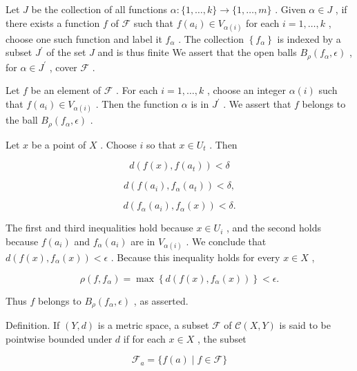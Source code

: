 \documentclass[10pt]{article}
\begin{document}
Let \(J\) be the collection of all functions \(\alpha  : \{ 1,\ldots ,k\}  \rightarrow  \{ 1,\ldots ,m\}\) . Given \(\alpha  \in  J\) , if there exists a function \(f\) of \(\mathcal{F}\) such that \(f\left( {a}_{i}\right)  \in  {V}_{\alpha \left( i\right) }\) for each \(i = 1,\ldots ,k\) , choose one such function and label it \({f}_{\alpha }\) . The collection \(\left\{  {f}_{\alpha }\right\}\) is indexed by a subset \({J}^{\prime }\) of the set \(J\) and is thus finite We assert that the open balls \({B}_{\rho }\left( {{f}_{\alpha },\epsilon }\right)\) , for \(\alpha  \in  {J}^{\prime }\) , cover \(\mathcal{F}\) .

Let \(f\) be an element of \(\mathcal{F}\) . For each \(i = 1,\ldots ,k\) , choose an integer \(\alpha \left( i\right)\) such that \(f\left( {a}_{i}\right)  \in  {V}_{\alpha \left( i\right) }\) . Then the function \(\alpha\) is in \({J}^{\prime }\) . We assert that \(f\) belongs to the ball \({B}_{\rho }\left( {{f}_{\alpha },\epsilon }\right)\) .

Let \(x\) be a point of \(X\) . Choose \(i\) so that \(x \in  {U}_{t}\) . Then

\[
d\left( {f\left( x\right) ,f\left( {a}_{t}\right) }\right)  < \delta
\]

\[
d\left( {f\left( {a}_{i}\right) ,{f}_{\alpha }\left( {a}_{t}\right) }\right)  < \delta ,
\]

\[
d\left( {{f}_{\alpha }\left( {a}_{i}\right) ,{f}_{\alpha }\left( x\right) }\right)  < \delta .
\]

The first and third inequalities hold because \(x \in  {U}_{i}\) , and the second holds because \(f\left( {a}_{i}\right)\) and \({f}_{\alpha }\left( {a}_{i}\right)\) are in \({V}_{\alpha \left( i\right) }\) . We conclude that \(d\left( {f\left( x\right) ,{f}_{\alpha }\left( x\right) }\right)  < \epsilon\) . Because this inequality holds for every \(x \in  X\) ,

\[
\rho \left( {f,{f}_{\alpha }}\right)  = \max \left\{  {d\left( {f\left( x\right) ,{f}_{\alpha }\left( x\right) }\right) }\right\}   < \epsilon .
\]

Thus \(f\) belongs to \({B}_{\rho }\left( {{f}_{\alpha },\epsilon }\right)\) , as asserted.

Definition. If \(\left( {Y,d}\right)\) is a metric space, a subset \(\mathcal{F}\) of \(\mathcal{C}\left( {X,Y}\right)\) is said to be pointwise bounded under \(d\) if for each \(x \in  X\) , the subset

\[
{\mathcal{F}}_{a} = \{ f\left( a\right)  \mid  f \in  \mathcal{F}\}
\]
\end{document}

